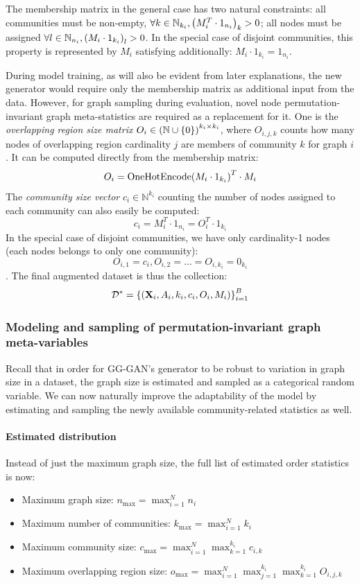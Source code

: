 The membership matrix in the general case has two natural constraints: all communities must be non-empty, $\forall k \in \mathbb{N}_{k_i}, \mathopen{}\left(M^T_i \cdot 1_{n_i}\right)_k > 0$; all nodes must be assigned $\forall l \in \mathbb{N}_{n_i}, \mathopen{}\left(M_i \cdot 1_{k_i}\right)_l > 0$. In the special case of disjoint communities, this property is represented by $M_i$ satisfying additionally: $M_i \cdot 1_{k_i} = 1_{n_i}$.

During model training, as will also be evident from later explanations, the new generator would require only the membership matrix as additional input from the data. However, for graph sampling during evaluation, novel node permutation-invariant graph meta-statistics are required as a replacement for it. One is the \emph{overlapping region size matrix} $O_i \in \mathopen{}\left(\mathbb{N}\cup\mathopen{}\left\{0\right\}\right)^{k_i \times k_i}$, where $O_{i,j,k}$ counts how many nodes of overlapping region cardinality $j$ are members of community $k$ for graph $i$. It can be computed directly from the membership matrix:
$$O_i = \text{OneHotEncode}\mathopen{}\left(M_i \cdot 1_{k_i}\right)^T \cdot M_i$$
The \emph{community size vector} $c_i \in \mathbb{N}^{k_i}$ counting the number of nodes assigned to each community can also easily be computed: $$c_i = M^T_i \cdot 1_{n_i} = O_i^T \cdot 1_{k_i}$$
In the special case of disjoint communities, we have only cardinality-1 nodes (each nodes belongs to only one community): $$O_{i,1}=c_i, O_{i,2}=\dots=O_{i,k_i}=0_{k_i}$$.
The final augmented dataset is thus the collection: $$\mathcal{D}^* = \mathopen{}\left\{\mathopen{}\left(\mathbf{X}_i, A_i, k_i, c_i, O_i, M_i\right)\right\}_{i=1}^{B}$$

\subsubsection{Modeling and sampling of permutation-invariant graph meta-variables}
Recall that in order for GG-GAN's generator to be robust to variation in graph size in a dataset, the graph size is estimated and sampled as a categorical random variable. We can now naturally improve the adaptability of the model by estimating and sampling the newly available community-related statistics as well.

\paragraph{Estimated distribution}

Instead of just the maximum graph size, the full list of estimated order statistics is now:
\begin{itemize}
\item Maximum graph size: $n_{\max}=\max_{i=1}^{N}{n_i}$
\item Maximum number of communities: $k_{\max}=\max_{i=1}^{N}{k_i}$
\item Maximum community size: $c_{\max}=\max_{i=1}^{N}\max_{k=1}^{k_i}{c_{i,k}}$
\item Maximum overlapping region size: $o_{\max}=\max_{i=1}^{N}\max_{j=1}^{k_i}\max_{k=1}^{k_i}{O_{i,j,k}}$
\end{itemize}


